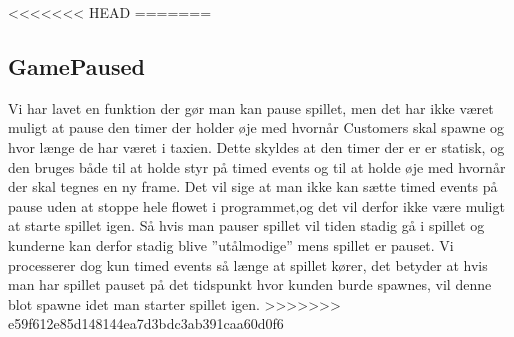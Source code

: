 <<<<<<< HEAD
=======

\subsection{GamePaused}
   Vi har lavet en funktion der gør man kan pause spillet, men det har ikke været muligt at pause den timer der holder øje med hvornår Customers skal spawne og hvor længe de har været i taxien. Dette skyldes at den timer der er er statisk, og den bruges både til at holde styr på timed events og til at holde øje med hvornår der skal tegnes en ny frame. Det vil sige at man ikke kan sætte timed events på pause uden at stoppe hele flowet i programmet,og det vil derfor ikke være muligt at starte spillet igen. Så hvis man pauser spillet vil tiden stadig gå i spillet og kunderne kan derfor stadig blive ''utålmodige'' mens spillet er pauset. Vi processerer dog kun timed events så længe at spillet kører, det betyder at hvis man har spillet pauset på det tidspunkt hvor kunden burde spawnes, vil denne blot spawne idet man starter spillet igen.  
>>>>>>> e59f612e85d148144ea7d3bdc3ab391caa60d0f6
